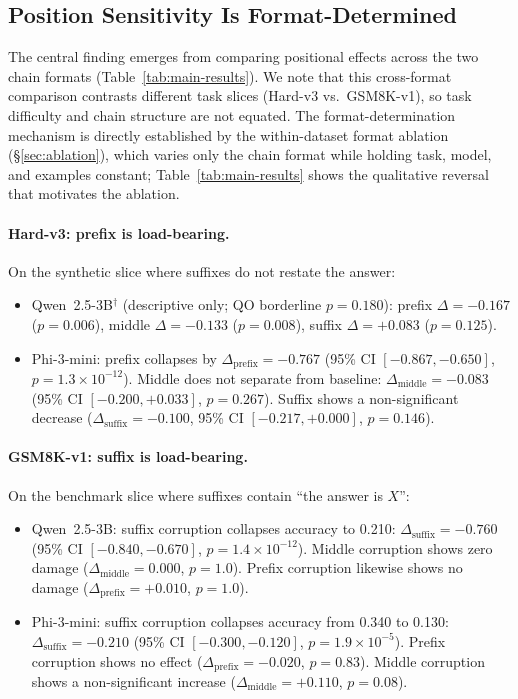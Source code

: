 \documentclass{article}
\theoremstyle{definition}
\theoremstyle{definition}
\begin{document}
\subsection{Position Sensitivity Is Format-Determined}
\label{sec:format-determined}

The central finding emerges from comparing positional effects across the
two chain formats (Table~\ref{tab:main-results}).
We note that this cross-format comparison contrasts different task
slices (Hard-v3 vs.\ GSM8K-v1), so task difficulty and chain structure
are not equated. The format-determination mechanism is directly
established by the within-dataset format ablation (\S\ref{sec:ablation}),
which varies only the chain format while holding task, model, and examples
constant; Table~\ref{tab:main-results} shows the qualitative reversal that
motivates the ablation.

\paragraph{Hard-v3: prefix is load-bearing.}
On the synthetic slice where suffixes do not restate the answer:
\begin{itemize}
  \item Qwen~2.5-3B$^\dagger$ (descriptive only; QO borderline $p=0.180$):
  prefix $\Delta = -0.167$ ($p = 0.006$),
  middle $\Delta = -0.133$ ($p = 0.008$),
  suffix $\Delta = +0.083$ ($p = 0.125$).

  \item Phi-3-mini: prefix collapses by $\Delta_\mathrm{prefix} = -0.767$
  (95\% CI $[-0.867, -0.650]$, $p = 1.3 \times 10^{-12}$).
  Middle does not separate from baseline:
  $\Delta_\mathrm{middle} = -0.083$
  (95\% CI $[-0.200, +0.033]$, $p = 0.267$).
  Suffix shows a non-significant decrease ($\Delta_\mathrm{suffix} = -0.100$,
  95\% CI $[-0.217, +0.000]$, $p = 0.146$).
\end{itemize}

\paragraph{GSM8K-v1: suffix is load-bearing.}
On the benchmark slice where suffixes contain ``the answer is $X$'':
\begin{itemize}
  \item Qwen~2.5-3B: suffix corruption collapses accuracy to 0.210:
  $\Delta_\mathrm{suffix} = -0.760$
  (95\% CI $[-0.840, -0.670]$, $p = 1.4 \times 10^{-12}$).
  Middle corruption shows zero damage ($\Delta_\mathrm{middle} = 0.000$, $p = 1.0$).
  Prefix corruption likewise shows no damage ($\Delta_\mathrm{prefix} = +0.010$, $p = 1.0$).

  \item Phi-3-mini: suffix corruption collapses accuracy from 0.340 to 0.130:
  $\Delta_\mathrm{suffix} = -0.210$
  (95\% CI $[-0.300, -0.120]$, $p = 1.9 \times 10^{-5}$).
  Prefix corruption shows no effect ($\Delta_\mathrm{prefix} = -0.020$, $p = 0.83$).
  Middle corruption shows a non-significant increase
  ($\Delta_\mathrm{middle} = +0.110$, $p = 0.08$).
\end{itemize}
\end{document}
